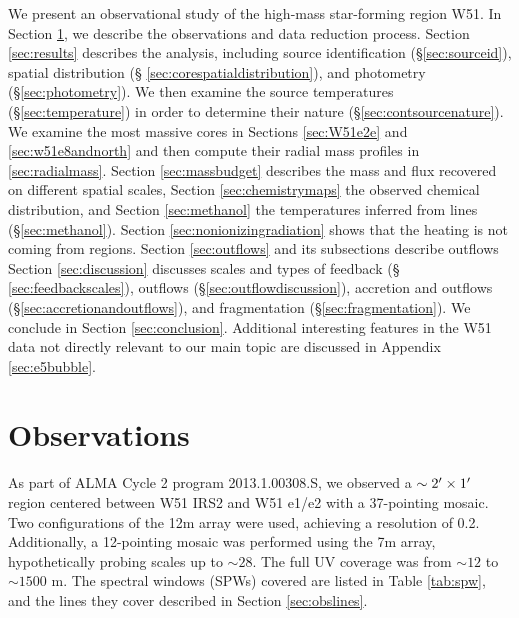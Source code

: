 \documentclass{aa}
\begin{document}
 We present an
observational study of the high-mass star-forming region W51.  In Section
\ref{sec:observations}, we describe the observations and data reduction
process.  Section \ref{sec:results} describes the analysis, including source
identification (\S \ref{sec:sourceid}), spatial distribution (\S
\ref{sec:corespatialdistribution}), and photometry (\S \ref{sec:photometry}).
We then examine the source temperatures (\S \ref{sec:temperature}) in order to
determine their nature (\S \ref{sec:contsourcenature}).  We examine the most
massive cores in Sections \ref{sec:W51e2e} and \ref{sec:w51e8andnorth} and then
compute their radial mass profiles in \ref{sec:radialmass}.
Section \ref{sec:massbudget} describes the mass and flux recovered on different
spatial scales,
Section \ref{sec:chemistrymaps}  the observed chemical distribution, and
Section \ref{sec:methanol} the
temperatures inferred from \methanol lines (\S \ref{sec:methanol}).
Section \ref{sec:nonionizingradiation} shows that the heating is not coming
from \hii regions.
Section \ref{sec:outflows} and its subsections describe outflows 
Section \ref{sec:discussion} discusses scales and types of feedback (\S
\ref{sec:feedbackscales}), outflows (\S \ref{sec:outflowdiscussion}),
accretion and outflows (\S \ref{sec:accretionandoutflows}),
and fragmentation (\S \ref{sec:fragmentation}).  
We conclude in Section \ref{sec:conclusion}.
Additional interesting features in the W51 data not directly relevant
to our main topic are discussed in Appendix \ref{sec:e5bubble}.







\section{Observations}
\label{sec:observations}
As part of ALMA Cycle 2 program 2013.1.00308.S, we observed a
$\sim2\mbox{$^\prime$}\times1\mbox{$^\prime$}$ region centered between W51 IRS2 and W51 e1/e2
with a 37-pointing mosaic.  Two configurations of the 12m array were used,
achieving a resolution of 0.2\arcsec.  Additionally, a 12-pointing mosaic was
performed using the 7m array, hypothetically probing scales up to
$\sim28$\arcsec.  The full UV coverage was from $\sim12$ to $\sim1500$ m.
The spectral windows (SPWs) covered are listed in Table \ref{tab:spw},
and the lines they cover described in Section \ref{sec:obslines}.
\end{document}
